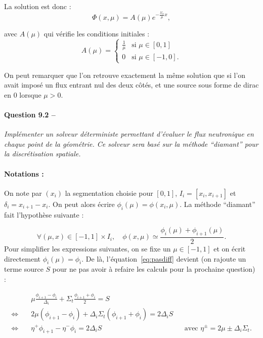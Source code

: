 \documentclass[11pt,a4paper]{article}
\newcommand{\question}[2]{\paragraph{Question #1 --}\hspace{-7pt}\textit{#2} \\}
\begin{document}
La solution est donc :
\begin{equation}
 \Phi(x, \mu) = A(\mu) e^{-\frac{\Sigma_a}{\mu}x} ,
\end{equation}

avec $A(\mu)$ qui vérifie les conditions initiales :
\begin{equation}
 A(\mu) = 
 \begin{cases}
  \frac{1}{\mu} & \text{si } \mu \in [0,1] \\
  0             & \text{si } \mu \in [-1,0] .
 \end{cases}
\end{equation}

On peut remarquer que l'on retrouve exactement la même solution que si l'on avait imposé un flux entrant nul des deux côtés, et une source sous forme de dirac en 0 lorsque $\mu>0$.

\question{9.2}{Implémenter un solveur déterministe permettant d'évaluer le flux neutronique en chaque point de la géométrie. Ce solveur sera basé sur la méthode ``diamant'' pour la discrétisation spatiale.} 

\paragraph{Notations :} On note par $(x_i)$ la segmentation choisie pour $[0,1]$, $I_i = [x_i,x_{i+1}]$ et $\delta_i = x_{i+1} - x_i$.
On peut alors écrire $\phi_i( \mu) = \phi(x_i,\mu)$.
La méthode ``diamant'' fait l'hypothèse suivante :

\begin{equation}
 \forall (\mu,x) \in [-1,1]\times I_i, \quad \phi(x,\mu) \simeq \frac{\phi_i(\mu) + \phi_{i+1}(\mu)}{2} .
\end{equation}
Pour simplifier les expressions suivantes, on se fixe un $\mu \in  [-1,1]$ et on écrit directement $\phi_i(\mu) = \phi_i$.
De là, l'équation~\ref{eq:pasdiff} devient (on rajoute un terme source $S$ pour ne pas avoir à refaire les calculs pour la prochaine question) :

\begin{align}
& \mu \frac{\phi_{i+1}-\phi_i}{\Delta_i} + \Sigma_t \frac{\phi_{i+1}+\phi_i}{2} = S\\
\Leftrightarrow \quad
& 2 \mu (\phi_{i+1}- \phi_i) + \Delta_i \Sigma_t (\phi_{i+1}+\phi_i) = 2 \Delta_i S\\
\Leftrightarrow \quad
& \eta^+ \phi_{i+1} - \eta^- \phi_i = 2 \Delta_i S
&& 	\text{avec } \eta^{\pm} = 2 \mu \pm \Delta_i \Sigma_t .
\end{align}
\end{document}
